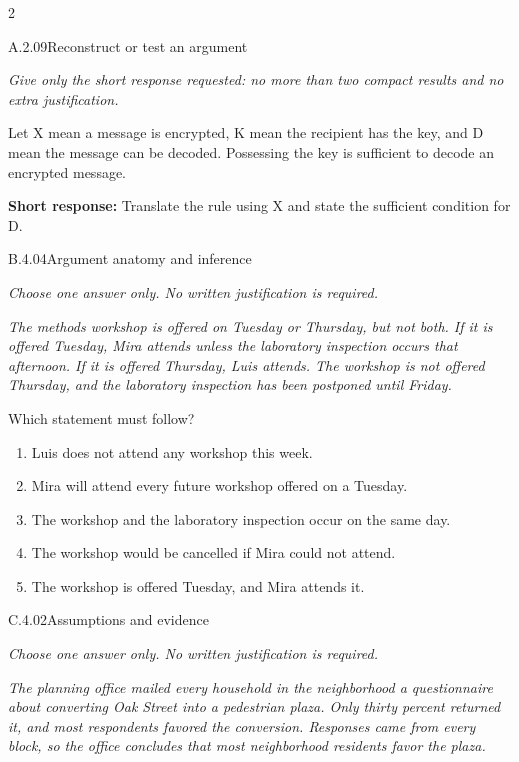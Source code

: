 \documentclass[9pt]{extarticle}
\newcommand{\choice}[1]{\item #1}
\begin{document}
\CoreWorkArea
\FormBreak
{}
\begin{multicols}{2}
\begin{DenseCoreProblem}{A.2.09}{Reconstruct or test an argument}
{\scriptsize\textit{Give only the short response requested: no more than two compact results and no extra justification.}\par}
Let X mean a message is encrypted, K mean the recipient has the key, and D mean the message can be decoded. Possessing the key is sufficient to decode an encrypted message.

\textbf{Short response:} Translate the rule using X and state the sufficient condition for D.
\end{DenseCoreProblem}
\begin{DenseCoreProblem}{B.4.04}{Argument anatomy and inference}
{\scriptsize\textit{Choose one answer only. No written justification is required.}\par}
\emph{The methods workshop is offered on Tuesday or Thursday, but not both. If it is offered Tuesday, Mira attends unless the laboratory inspection occurs that afternoon. If it is offered Thursday, Luis attends. The workshop is not offered Thursday, and the laboratory inspection has been postponed until Friday.}

Which statement must follow?
\begin{enumerate}[label=(\alph*)]
  \choice{Luis does not attend any workshop this week.}
  \choice{Mira will attend every future workshop offered on a Tuesday.}
  \choice{The workshop and the laboratory inspection occur on the same day.}
  \choice{The workshop would be cancelled if Mira could not attend.}
  \choice{The workshop is offered Tuesday, and Mira attends it.}
\end{enumerate}
\end{DenseCoreProblem}
\columnbreak
\begin{DenseCoreProblem}{C.4.02}{Assumptions and evidence}
{\scriptsize\textit{Choose one answer only. No written justification is required.}\par}
\emph{The planning office mailed every household in the neighborhood a questionnaire about converting Oak Street into a pedestrian plaza. Only thirty percent returned it, and most respondents favored the conversion. Responses came from every block, so the office concludes that most neighborhood residents favor the plaza.}


\end{DenseCoreProblem}
\end{multicols}
\end{document}
